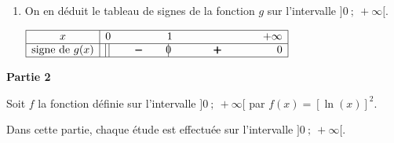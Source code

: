 \documentclass[10pt]{article}
\providecommand{\ds}{\displaystyle}
\begin{document}
\begin{enumerate}
\begin{enumerate}
		\item On justifie les limites de la fonction $g$ aux bornes de son ensemble de définition.
		
	\end{enumerate}
	
\item On en déduit le tableau de signes de la fonction $g$ sur l'intervalle $]0~;~+ \infty[$.

\begin{center}
\renewcommand{\arraystretch}{1.2}
\def\esp{\hspace*{1.1cm}}
$\begin{array}{|c |l *{3}{c} r|} 
\hline
x  & 0 & \esp & 1 & \esp\esp  & +\infty \\
\hline
\text{signe de }g(x) & \vline\;\vline  & \pmb{-} &  \vline\hspace{-2.7pt}{0} & \pmb{+} & 0   \\
\hline
\end{array}$
\renewcommand{\arraystretch}{1}
\end{center}

\end{enumerate}

\bigskip

\textbf{Partie 2}

\medskip

Soit $f$ la fonction définie sur l'intervalle $]0~;~ + \infty[$ par 
$f(x) = [\ln (x)]^2.$

 Dans cette partie, chaque étude est effectuée sur l'intervalle $]0~;~+ \infty[$.
\end{document}
